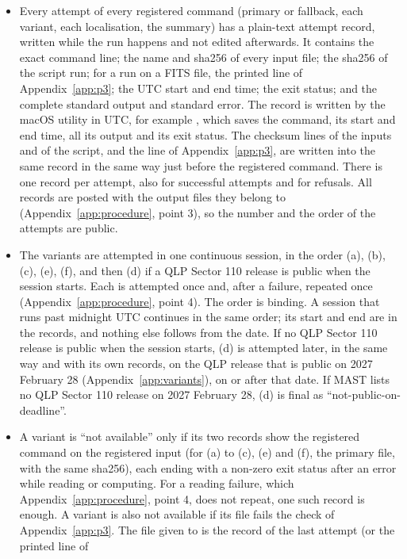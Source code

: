 \begin{itemize}
\item Every attempt of every registered command (primary or fallback, each variant, each localisation, the summary)
  has a plain-text attempt record, written while the run happens and not edited afterwards. It contains the exact
  command line; the name and sha256 of every input file; the sha256 of the script run; for a run on a FITS file, the
  printed line of Appendix~\ref{app:p3}; the UTC start and end time; the exit status; and the complete standard output and
  standard error. The record is written by the macOS  utility in UTC, for example
  , which saves the command, its start and end time, all its output and its exit
  status. The checksum lines of the inputs and of the script, and the line of Appendix~\ref{app:p3}, are written into
  the same record in the same way just before the registered command. There is one record per attempt, also for
  successful attempts and for refusals. All records are posted with the output files they belong to
  (Appendix~\ref{app:procedure}, point 3), so the number and the order of the attempts are public.
\item The variants are attempted in one continuous session, in the order (a), (b), (c), (e), (f), and then (d) if a QLP
  Sector 110 release is public when the session starts. Each is attempted once and, after a failure, repeated once
  (Appendix~\ref{app:procedure}, point 4). The order is binding. A session that runs past midnight UTC continues in the
  same order; its start and end are in the records, and nothing else follows from the date. If no QLP Sector 110
  release is public when the session starts, (d) is attempted later, in the same way and with its own records, on the
  QLP release that is public on 2027 February 28 (Appendix~\ref{app:variants}), on or after that date. If MAST lists no
  QLP Sector 110 release on 2027 February 28, (d) is final as ``not-public-on-deadline''.
\item A variant is ``not available'' only if its two records show the registered command on the registered input (for
  (a) to (c), (e) and (f), the primary file, with the same sha256), each ending with a non-zero exit status after an
  error while reading or computing. For a reading failure, which Appendix~\ref{app:procedure}, point 4, does not repeat,
  one such record is enough. A variant is also not available if its file fails the check of Appendix~\ref{app:p3}. The
  file given to  is the record of the last attempt (or the printed line of

\end{itemize}
